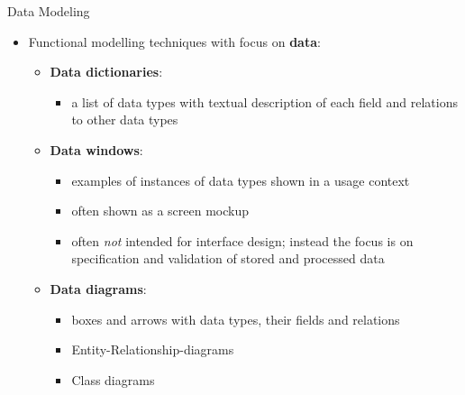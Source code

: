 \begin{Slide}{Data Modeling }
\begin{itemize}
\item Functional modelling techniques with focus on \textbf{data}:
\begin{itemize}
\item \textbf{Data dictionaries}: 
\begin{itemize}
\item a list of data types with textual description of each field and relations to other data types
\end{itemize}
\item \textbf{Data windows}: 
\begin{itemize}
\item examples of instances of data types shown in a usage context
\item often shown as a screen mockup
\item often \textit{not} intended for interface design; instead the focus is on specification and validation of stored and processed data 
\end{itemize}
\item \textbf{Data diagrams}: 
\begin{itemize}
\item boxes and arrows with data types, their fields and relations  
\item Entity-Relationship-diagrams
\item Class diagrams

\end{itemize}
\end{itemize}
\end{itemize}
\end{Slide}